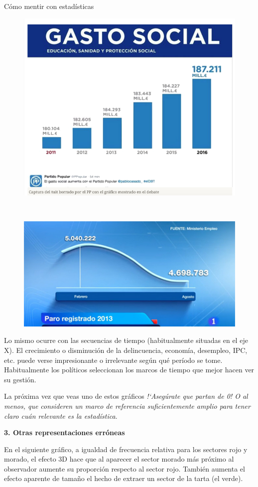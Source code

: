 \begin{myexampleblock}{Cómo mentir con estadísticas}
\begin{multicols}{2}
	\begin{figure}[H]
			\centering
			\includegraphics[width=.5\textwidth]{imagenes/imagenes01/T01IM34.png}
	\end{figure}
	
	\textcolor{white}{.}
	
	\begin{figure}[H]
			\centering
			\includegraphics[width=.5\textwidth]{imagenes/imagenes01/T01IM35.png}
	\end{figure}
\end{multicols}



\vspace{2mm} Lo mismo ocurre con las secuencias de tiempo (habitualmente situadas en el eje X). El crecimiento o disminución de la delincuencia, economía, desempleo, IPC, etc. puede verse impresionante o irrelevante según qué período se tome. Habitualmente los políticos seleccionan los marcos de tiempo que mejor hacen ver su gestión.

\vspace{2mm} La próxima vez que veas uno de estos gráficos \emph{!`Asegúrate que partan de 0! O al menos, que consideren un marco de referencia suficientemente amplio para tener claro cuán relevante es la estadística}.

\vspace{2mm}  \textbf{3. Otras representaciones erróneas}

\vspace{2mm}  En el siguiente gráfico, a igualdad de frecuencia relativa para los sectores rojo y morado, el efecto 3D hace que al aparecer el sector morado más próximo al observador aumente su proporción respecto al sector rojo. También aumenta el efecto aparente de tamaño el hecho de extraer un sector de la tarta (el verde).


\end{myexampleblock}
